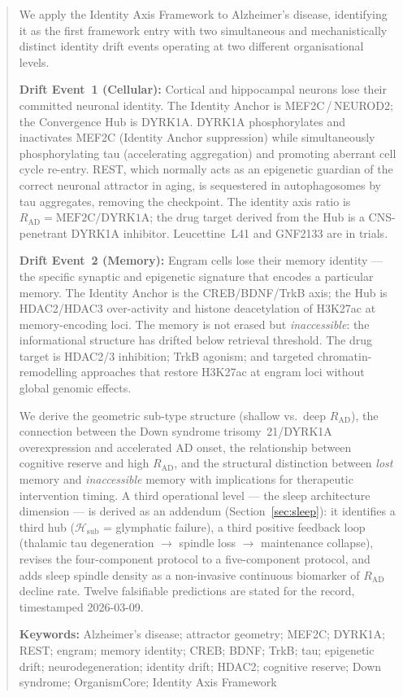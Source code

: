 \documentclass[12pt,a4paper]{article}
\newcommand{\RAD}{R_{\mathrm{AD}}}
\begin{document}
\vspace{1em}

\begin{abstract}
\noindent
We apply the Identity Axis Framework to Alzheimer's disease,
identifying it as the first framework entry with two
simultaneous and mechanistically distinct identity drift
events operating at two different organisational levels.

\textbf{Drift Event~1 (Cellular):} Cortical and hippocampal
neurons lose their committed neuronal identity. The Identity
Anchor is MEF2C\,/\,NEUROD2; the Convergence Hub is DYRK1A.
DYRK1A phosphorylates and inactivates MEF2C (Identity
Anchor suppression) while simultaneously phosphorylating
tau (accelerating aggregation) and promoting aberrant cell
cycle re-entry. REST, which normally acts as an epigenetic
guardian of the correct neuronal attractor in aging,
is sequestered in autophagosomes by tau aggregates,
removing the checkpoint. The identity axis ratio is
$\RAD = \text{MEF2C} / \text{DYRK1A}$; the drug target
derived from the Hub is a CNS-penetrant DYRK1A inhibitor.
Leucettine~L41 and GNF2133 are in trials.

\textbf{Drift Event~2 (Memory):} Engram cells lose their
memory identity --- the specific synaptic and epigenetic
signature that encodes a particular memory. The Identity
Anchor is the CREB/BDNF/TrkB axis; the Hub is HDAC2/HDAC3
over-activity and histone deacetylation of H3K27ac at
memory-encoding loci. The memory is not erased but
\emph{inaccessible}: the informational structure has drifted
below retrieval threshold. The drug target is HDAC2/3
inhibition; TrkB agonism; and targeted
chromatin-remodelling approaches that restore H3K27ac
at engram loci without global genomic effects.

We derive the geometric sub-type structure (shallow vs.\
deep $\RAD$), the connection between the Down syndrome
trisomy~21/DYRK1A overexpression and accelerated AD onset,
the relationship between cognitive reserve and high $\RAD$,
and the structural distinction between \emph{lost} memory
and \emph{inaccessible} memory with implications for
therapeutic intervention timing. A third operational
level --- the sleep architecture dimension --- is
derived as an addendum (Section~\ref{sec:sleep}):
it identifies a third hub ($\mathcal{H}_{\mathrm{sub}}$
= glymphatic failure), a third positive feedback loop
(thalamic tau degeneration $\to$ spindle loss $\to$
maintenance collapse), revises the four-component
protocol to a five-component protocol, and adds
sleep spindle density as a non-invasive continuous
biomarker of $\RAD$ decline rate. Twelve falsifiable
predictions are stated for the record, timestamped
2026-03-09.

\medskip\noindent\textbf{Keywords:}
Alzheimer's disease; attractor geometry; MEF2C; DYRK1A;
REST; engram; memory identity; CREB; BDNF; TrkB; tau;
epigenetic drift; neurodegeneration; identity drift;
HDAC2; cognitive reserve; Down syndrome;
OrganismCore; Identity Axis Framework
\end{abstract}
\end{document}
